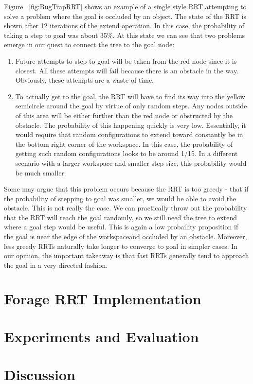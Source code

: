 \documentclass[conference]{IEEEtran}
\begin{document}
Figure ~\ref{fig:BugTrapRRT} shows an example of a single style RRT attempting to solve a problem where the goal is occluded by an object.
The state of the RRT is shown after 12 iterations of the extend operation. In this case, the probability of taking a step to goal was about
35\%. At this state we can see that two problems emerge in our quest to connect the tree to the goal node:
\begin{enumerate}
\item Future attempts to step to goal will be taken from the red node since it is closest. All these attempts will fail because there is an
obstacle in the way. Obviously, these attempts are a waste of time.
\item To actually get to the goal, the RRT will have to find its way into the yellow semicircle around the goal by virtue of only random
steps. Any nodes outside of this area will be either further than the red node or obstructed by the obstacle. The probability of this
happening quickly is very low. Essentially, it would require that random configurations to extend toward constantly be in the bottom right
corner of the workspace. In this case, the probability of getting such random configurations looks to be around 1/15. In a different
scenario with a larger workspace and smaller step size, this probability would be much smaller. 
\end{enumerate}

Some may argue that this problem occurs because the RRT is too greedy - that if the probability of stepping to goal was smaller, we would be
able to avoid the obstacle. This is not really the case. We can practically throw out the probability that the RRT will reach the goal
randomly, so we still need the tree to extend where a goal step would be useful. This is again a low probaility proposition if the goal is
near the edge of the workspaceand occluded by an obstacle. Moreover, less greedy RRTs naturally take longer to converge to goal in simpler
cases. In our opinion, the important takeaway is that fast RRTs generally tend to approach the goal in a very directed fashion.


\section{Forage RRT Implementation}

\section{Experiments and Evaluation}

\section{Discussion}



\end{document}
